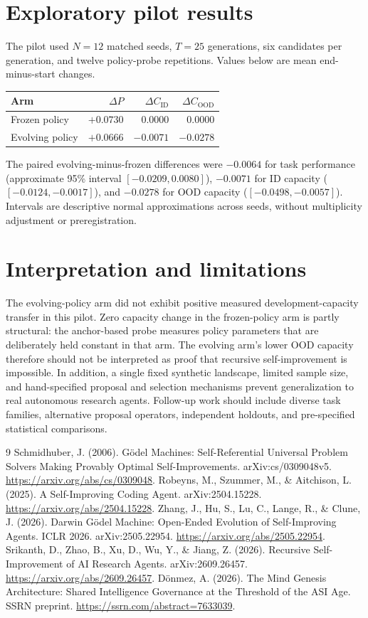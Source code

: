 \documentclass[11pt,a4paper]{article}
\begin{document}
\section{Exploratory pilot results}
The pilot used $N=12$ matched seeds, $T=25$ generations, six candidates per generation, and twelve policy-probe repetitions. Values below are mean end-minus-start changes.
\begin{center}
\begin{tabular}{lrrr}
\toprule
Arm & $\Delta P$ & $\Delta C_{\mathrm{ID}}$ & $\Delta C_{\mathrm{OOD}}$\\
\midrule
Frozen policy & $+0.0730$ & $0.0000$ & $0.0000$\\
Evolving policy & $+0.0666$ & $-0.0071$ & $-0.0278$\\
\bottomrule
\end{tabular}
\end{center}
The paired evolving-minus-frozen differences were $-0.0064$ for task performance (approximate 95\% interval $[-0.0209,0.0080]$), $-0.0071$ for ID capacity ($[-0.0124,-0.0017]$), and $-0.0278$ for OOD capacity ($[-0.0498,-0.0057]$). Intervals are descriptive normal approximations across seeds, without multiplicity adjustment or preregistration.

\section{Interpretation and limitations}
The evolving-policy arm did not exhibit positive measured development-capacity transfer in this pilot. Zero capacity change in the frozen-policy arm is partly structural: the anchor-based probe measures policy parameters that are deliberately held constant in that arm. The evolving arm's lower OOD capacity therefore should not be interpreted as proof that recursive self-improvement is impossible. In addition, a single fixed synthetic landscape, limited sample size, and hand-specified proposal and selection mechanisms prevent generalization to real autonomous research agents. Follow-up work should include diverse task families, alternative proposal operators, independent holdouts, and pre-specified statistical comparisons.

\begin{thebibliography}{9}
 Schmidhuber, J. (2006). G\"odel Machines: Self-Referential Universal Problem Solvers Making Provably Optimal Self-Improvements. arXiv:cs/0309048v5. \url{https://arxiv.org/abs/cs/0309048}.
 Robeyns, M., Szummer, M., \& Aitchison, L. (2025). A Self-Improving Coding Agent. arXiv:2504.15228. \url{https://arxiv.org/abs/2504.15228}.
 Zhang, J., Hu, S., Lu, C., Lange, R., \& Clune, J. (2026). Darwin G\"odel Machine: Open-Ended Evolution of Self-Improving Agents. ICLR 2026. arXiv:2505.22954. \url{https://arxiv.org/abs/2505.22954}.
 Srikanth, D., Zhao, B., Xu, D., Wu, Y., \& Jiang, Z. (2026). Recursive Self-Improvement of AI Research Agents. arXiv:2609.26457. \url{https://arxiv.org/abs/2609.26457}.
 D\"onmez, A. (2026). The Mind Genesis Architecture: Shared Intelligence Governance at the Threshold of the ASI Age. SSRN preprint. \url{https://ssrn.com/abstract=7633039}.
\end{thebibliography}
\end{document}
